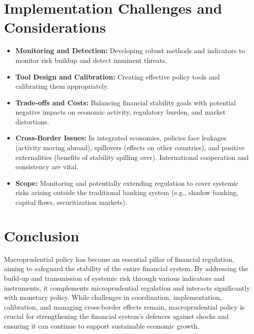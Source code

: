 \section{Implementation Challenges and Considerations}

\begin{itemize}
    \item \textbf{Monitoring and Detection:} Developing robust methods and indicators to monitor risk buildup and detect imminent threats.
    \item \textbf{Tool Design and Calibration:} Creating effective policy tools and calibrating them appropriately.
    \item \textbf{Trade-offs and Costs:} Balancing financial stability goals with potential negative impacts on economic activity, regulatory burden, and market distortions.
    \item \textbf{Cross-Border Issues:} In integrated economies, policies face leakages (activity moving abroad), spillovers (effects on other countries), and positive externalities (benefits of stability spilling over). International cooperation and consistency are vital.
    \item \textbf{Scope:} Monitoring and potentially extending regulation to cover systemic risks arising outside the traditional banking system (e.g., shadow banking, capital flows, securitization markets).
\end{itemize}

\section{Conclusion}

Macroprudential policy has become an essential pillar of financial regulation, aiming to safeguard the stability of the entire financial system. By addressing the build-up and transmission of systemic risk through various indicators and instruments, it complements microprudential regulation and interacts significantly with monetary policy. While challenges in coordination, implementation, calibration, and managing cross-border effects remain, macroprudential policy is crucial for strengthening the financial system's defences against shocks and ensuring it can continue to support sustainable economic growth.
